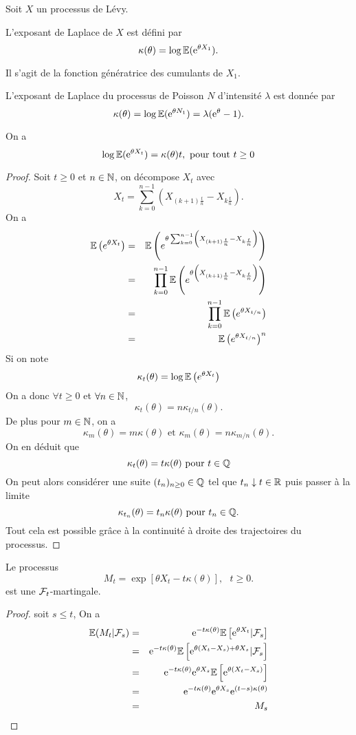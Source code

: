 Soit $X$ un processus de Lévy.
\begin{definition}
L'exposant de Laplace de $X$ est défini par 
$$
\kappa(\theta) = \log \mathbb{E}(\mathrm{e}^{\theta X_1}).
$$
\end{definition}
Il s'agit de la fonction génératrice des cumulants de $X_1$.
\begin{ex}
L'exposant de Laplace du processus de Poisson $N$ d'intensité $\lambda$ est donnée par 
$$
\kappa(\theta) = \log\mathbb{E}(\mathrm{e}^{\theta N_1}) = \lambda(\mathrm{e}^\theta - 1). 
$$
\end{ex}
\begin{prop}
On a 
$$
\log \mathbb{E}(\mathrm{e}^{\theta X_t}) = \kappa(\theta)t,\text{ pour tout }t\geq 0
$$
\end{prop}
\begin{proof}
Soit $t\geq 0$ et $n\in \mathbb{N}$, on décompose $X_t$ avec 
$$
X_t=\sum_{k=0}^{n-1}\left(X_{(k+1)\frac{t}{n}} - X_{k\frac{t}{n}} \right).
$$
On a 
\begin{eqnarray*}
\mathbb{E}\left(e^{\theta X_t}\right)&=&\mathbb{E}\left(e^{\theta \sum_{k=0}^{n-1}\left(X_{(k+1)\frac{t}{n}} - X_{k\frac{t}{n}} \right)}\right)\\
&=&\prod_{k=0}^{n-1}\mathbb{E}\left(e^{\theta \left(X_{(k+1)\frac{t}{n}} - X_{k\frac{t}{n}} \right)}\right)\\
&=&\prod_{k=0}^{n-1}\mathbb{E}\left(e^{\theta X_{t/n}}\right)\\
&=&\mathbb{E}\left(e^{\theta X_{t/n}}\right)^n\\
\end{eqnarray*}
Si on note 
$$
\kappa_t(\theta) = \log \mathbb{E}\left(e^{\theta X_t}\right)
$$
On a donc $\forall t\geq 0$ et $\forall n\in \mathbb{N}$,
$$
\kappa_t(\theta) = n\kappa_{t/n}(\theta).
$$
De plus pour $m\in\mathbb{N}$, on a 
$$
\kappa_m(\theta) = m\kappa(\theta)\text{ et }\kappa_m(\theta) = n\kappa_{m/n}(\theta).
$$
On en déduit que 
$$
\kappa_t(\theta) = t\kappa(\theta)\text{ pour }t\in\mathbb{Q}
$$
On peut alors considérer une suite $(t_n)_{n\geq 0}\in \mathbb{Q}$ tel que $t_n\downarrow t\in \mathbb{R}$ puis passer à la limite 
$$
\kappa_{t_n}(\theta) = t_n\kappa(\theta)\text{ pour }t_n\in\mathbb{Q}.
$$
Tout cela est possible grâce à la continuité à droite des trajectoires du processus.
\end{proof}
\begin{prop}\label{prop:Wald_martingale_Levy}
Le processus 
$$
M_t = \exp\left[\theta X_t - t\kappa(\theta)\right],\text{ }t\geq 0.
$$
est une $\mathcal{F}_t$-martingale.
\end{prop}
\begin{proof}
soit $s\leq t$, On a 
\begin{eqnarray*}
\mathbb{E}(M_t|\mathcal{F}_s)&=&\mathrm{e}^{-t\kappa(\theta)}\mathbb{E}\left[\mathrm{e}^{\theta X_t}|\mathcal{F}_s\right]\\
&=&\mathrm{e}^{-t\kappa(\theta)}\mathbb{E}\left[\mathrm{e}^{\theta (X_t-X_s) +\theta X_s}|\mathcal{F}_s\right]\\
&=&\mathrm{e}^{-t\kappa(\theta)}\mathrm{e}^{\theta X_s}\mathbb{E}\left[\mathrm{e}^{\theta (X_t-X_s)}\right]\\
&=&\mathrm{e}^{-t\kappa(\theta)}\mathrm{e}^{\theta X_s}\mathrm{e}^{(t-s)\kappa(\theta)}\\
&=&M_s\\
\end{eqnarray*}
\end{proof}
